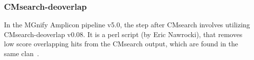 \subsubsection{CMsearch-deoverlap}\label{subsubsec:CMsearch-deoverlap}
In the MGnify Amplicon pipeline v5.0, the step after CMsearch involves utilizing CMsearch-deoverlap v0.08. It is a perl script (by Eric Nawrocki), that removes low score overlapping hits from the CMsearch output, which are found in the same clan~\cite{nawrocki_nawrockiecmsearch_tblout_deoverlap_2023}.